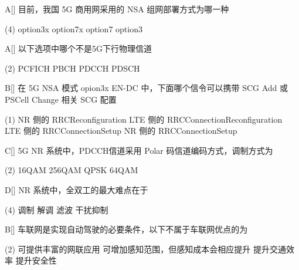 \begin{choice}{A}[]
    目前，我国 5G 商用网采用的 NSA 组网部署方式为哪一种
    \begin{tasks}(4)
        \task option3x
        \task option7x
        \task option7
        \task option3
    \end{tasks}
\end{choice}


\begin{choice}{A}[]
    以下选项中哪个不是5G下行物理信道
    \begin{tasks}(2)
        \task PCFICH
        \task PBCH
        \task PDCCH
        \task PDSCH
    \end{tasks}
\end{choice}


\begin{choice}{B}[]
    在 5G NSA 模式 opion3x EN-DC 中，下面哪个信令可以携带 SCG Add 或 PSCell Change 相关 SCG 配置
    \begin{tasks}(1)
        \task NR 侧的 RRCReconfiguration
        \task LTE 侧的 RRCConnectionReconfiguration
        \task  LTE 侧的 RRCConnectionSetup
        \task NR 侧的 RRCConnectionSetup
    \end{tasks}
\end{choice}


\begin{choice}{C}[]
    5G NR 系统中，PDCCH信道采用 Polar 码信道编码方式，调制方式为
    \begin{tasks}(2)
        \task 16QAM
        \task 256QAM
        \task QPSK
        \task 64QAM
    \end{tasks}
\end{choice}

\begin{choice}{D}[]
    NR 系统中，全双工的最大难点在于
    \begin{tasks}(4)
        \task 调制
        \task 解调
        \task 滤波
        \task 干扰抑制
    \end{tasks}
\end{choice}

\begin{choice}{B}[]
    车联网是实现自动驾驶的必要条件，以下不属于车联网优点的为
    \begin{tasks}(2)
        \task 可提供丰富的网联应用
        \task 可增加感知范围，但感知成本会相应提升
        \task 提升交通效率
        \task 提升安全性
    \end{tasks}
\end{choice}



